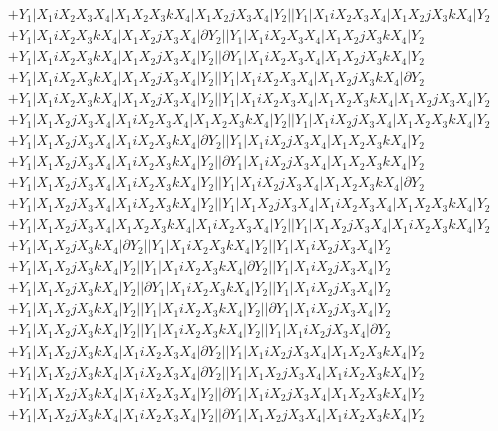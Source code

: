 \documentclass{article}[12pt]
\begin{document}
\begin{align*}
 & +Y_1|X_1iX_2X_3X_4|X_1X_2X_3kX_4|X_1X_2jX_3X_4|Y_2||Y_1|X_1iX_2X_3X_4|X_1X_2jX_3kX_4|Y_2\\ 
 & +Y_1|X_1iX_2X_3kX_4|X_1X_2jX_3X_4|\partial Y_2||Y_1|X_1iX_2X_3X_4|X_1X_2jX_3kX_4|Y_2\\ 
 & +Y_1|X_1iX_2X_3kX_4|X_1X_2jX_3X_4|Y_2||\partial Y_1|X_1iX_2X_3X_4|X_1X_2jX_3kX_4|Y_2\\ 
 & +Y_1|X_1iX_2X_3kX_4|X_1X_2jX_3X_4|Y_2||Y_1|X_1iX_2X_3X_4|X_1X_2jX_3kX_4|\partial Y_2\\ 
 & +Y_1|X_1iX_2X_3kX_4|X_1X_2jX_3X_4|Y_2||Y_1|X_1iX_2X_3X_4|X_1X_2X_3kX_4|X_1X_2jX_3X_4|Y_2\\ 
 & +Y_1|X_1X_2jX_3X_4|X_1iX_2X_3X_4|X_1X_2X_3kX_4|Y_2||Y_1|X_1iX_2jX_3X_4|X_1X_2X_3kX_4|Y_2\\ 
 & +Y_1|X_1X_2jX_3X_4|X_1iX_2X_3kX_4|\partial Y_2||Y_1|X_1iX_2jX_3X_4|X_1X_2X_3kX_4|Y_2\\ 
 & +Y_1|X_1X_2jX_3X_4|X_1iX_2X_3kX_4|Y_2||\partial Y_1|X_1iX_2jX_3X_4|X_1X_2X_3kX_4|Y_2\\ 
 & +Y_1|X_1X_2jX_3X_4|X_1iX_2X_3kX_4|Y_2||Y_1|X_1iX_2jX_3X_4|X_1X_2X_3kX_4|\partial Y_2\\ 
 & +Y_1|X_1X_2jX_3X_4|X_1iX_2X_3kX_4|Y_2||Y_1|X_1X_2jX_3X_4|X_1iX_2X_3X_4|X_1X_2X_3kX_4|Y_2\\ 
 & +Y_1|X_1X_2jX_3X_4|X_1X_2X_3kX_4|X_1iX_2X_3X_4|Y_2||Y_1|X_1X_2jX_3X_4|X_1iX_2X_3kX_4|Y_2\\ 
 & +Y_1|X_1X_2jX_3kX_4|\partial Y_2||Y_1|X_1iX_2X_3kX_4|Y_2||Y_1|X_1iX_2jX_3X_4|Y_2\\ 
 & +Y_1|X_1X_2jX_3kX_4|Y_2||Y_1|X_1iX_2X_3kX_4|\partial Y_2||Y_1|X_1iX_2jX_3X_4|Y_2\\ 
 & +Y_1|X_1X_2jX_3kX_4|Y_2||\partial Y_1|X_1iX_2X_3kX_4|Y_2||Y_1|X_1iX_2jX_3X_4|Y_2\\ 
 & +Y_1|X_1X_2jX_3kX_4|Y_2||Y_1|X_1iX_2X_3kX_4|Y_2||\partial Y_1|X_1iX_2jX_3X_4|Y_2\\ 
 & +Y_1|X_1X_2jX_3kX_4|Y_2||Y_1|X_1iX_2X_3kX_4|Y_2||Y_1|X_1iX_2jX_3X_4|\partial Y_2\\ 
 & +Y_1|X_1X_2jX_3kX_4|X_1iX_2X_3X_4|\partial Y_2||Y_1|X_1iX_2jX_3X_4|X_1X_2X_3kX_4|Y_2\\ 
 & +Y_1|X_1X_2jX_3kX_4|X_1iX_2X_3X_4|\partial Y_2||Y_1|X_1X_2jX_3X_4|X_1iX_2X_3kX_4|Y_2\\ 
 & +Y_1|X_1X_2jX_3kX_4|X_1iX_2X_3X_4|Y_2||\partial Y_1|X_1iX_2jX_3X_4|X_1X_2X_3kX_4|Y_2\\ 
 & +Y_1|X_1X_2jX_3kX_4|X_1iX_2X_3X_4|Y_2||\partial Y_1|X_1X_2jX_3X_4|X_1iX_2X_3kX_4|Y_2\\ 

\end{align*}
\end{document}
